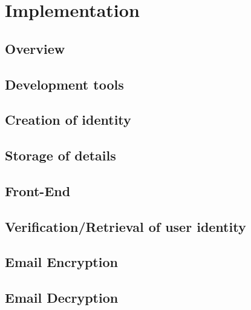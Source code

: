 \chapter{Implementation}

\section{Overview}
\section{Development tools}
\section{Creation of identity}
\section{Storage of details}
\section{Front-End}
\section{Verification/Retrieval of user identity}
\section{Email Encryption}
\section{Email Decryption}
